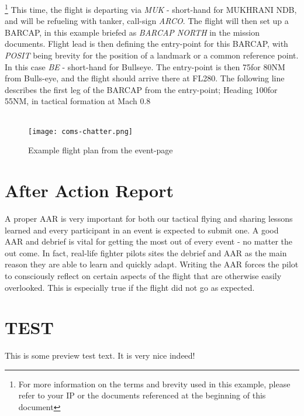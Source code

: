 {        \footnote{
        	For more information on the terms and brevity used in this example, please refer to your IP or the documents referenced at the beginning of this document
         } 
        This time, the flight is departing via \textit{MUK} - short-hand for MUKHRANI NDB, and will be refueling with tanker, call-sign \textit{ARCO}. The flight will then set up a BARCAP, in this example briefed as \textit{BARCAP NORTH} in the mission documents. Flight lead is then defining the entry-point for this BARCAP, with \textit{POSIT} being brevity for the position of a landmark or a common reference point. In this case \textit{BE} - short-hand for Bullseye. The entry-point is then 75\degree for 80NM from Bulls-eye, and the flight should arrive there at FL280. The following line describes the first leg of the BARCAP from the entry-point; Heading 100\degree for 55NM, in tactical formation at Mach 0.8 \\ \\
    }
   	
  \begin{figure}[!ht]
  	\texttt{[image: coms-chatter.png]}
    	\label{coms-chatter}
    	\caption{Example flight plan from the event-page}
  \end{figure}


\section{After Action Report}
	\textnormal{
    	A proper AAR is very important for both our tactical flying and sharing lessons learned and every participant in an event is expected to submit one. A good AAR and debrief is vital for getting the most out of every event - no matter the out come. In fact, real-life fighter pilots sites the debrief and AAR as the main reason they are able to learn and quickly adapt. Writing the AAR forces the pilot to consciously reflect on certain aspects of the flight that are otherwise easily overlooked. This is especially true if the flight did not go as expected.
    }

\section{TEST}
  \textnormal{
    This is some preview test text. It is very nice indeed!
  }